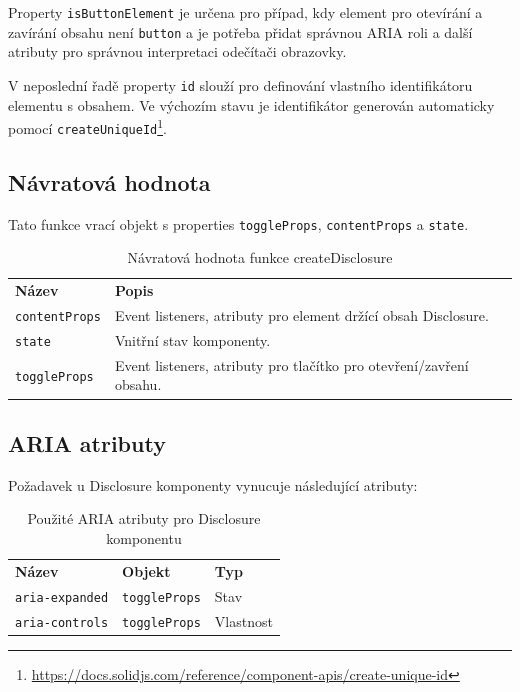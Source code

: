 Property \texttt{isButtonElement} je určena pro případ, kdy element pro otevírání a zavírání obsahu není \texttt{button} a je potřeba přidat správnou ARIA roli a další atributy pro správnou interpretaci odečítači obrazovky.

V neposlední řadě property \texttt{id} slouží pro definování vlastního identifikátoru elementu s obsahem.
Ve výchozím stavu je identifikátor generován automaticky pomocí \texttt{createUniqueId}\footnote{\url{https://docs.solidjs.com/reference/component-apis/create-unique-id}}.

\clearpage

\subsection{Návratová hodnota}

Tato funkce vrací objekt s properties \texttt{toggleProps}, \texttt{contentProps} a \texttt{state}.

\begin{table}[ht]\label{table:disclosure-return}
    \begin{ctucolortab}
        \begin{tabularx}{\textwidth}{p{3cm} X}
            \bfseries Název       & \bfseries Popis                                                     \\\Midrule{}
            \texttt{contentProps} & Event listeners, atributy pro element držící obsah Disclosure.      \\
            \texttt{state}        & Vnitřní stav komponenty.                                            \\
            \texttt{toggleProps}  & Event listeners, atributy pro tlačítko pro otevření/zavření obsahu.
        \end{tabularx}
    \end{ctucolortab}
    \caption{Návratová hodnota funkce createDisclosure}
\end{table}

\subsection{ARIA atributy}

Požadavek \hyperref[ofr12]{} u Disclosure komponenty vynucuje následující atributy:

\begin{table}[ht]\label{table:disclosure-aria}
    \begin{ctucolortab}
        \begin{tabularx}{\textwidth}{X X X}
            \bfseries Název        & \bfseries Objekt     & \bfseries Typ \\\Midrule{}
            \texttt{aria-expanded} & \texttt{toggleProps} & Stav          \\
            \texttt{aria-controls} & \texttt{toggleProps} & Vlastnost
        \end{tabularx}
    \end{ctucolortab}
    \caption{Použité ARIA atributy pro Disclosure komponentu}
\end{table}

